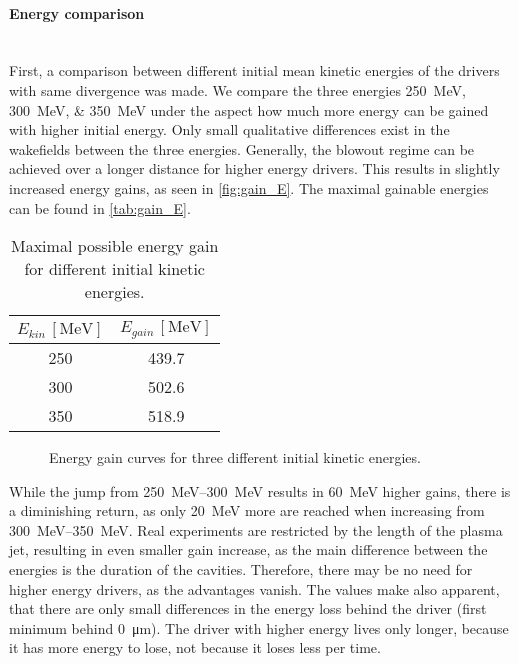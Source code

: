 \documentclass[bachelor_thesis]{subfiles}
\begin{document}
\paragraph*{Energy comparison}\hspace{0pt} \\
First, a comparison between different initial mean kinetic energies of the drivers with same divergence was made. We compare the three energies \qtylist{250; 300; 350}{\MeV} under the aspect how much more energy can be gained with higher initial energy.
Only small qualitative differences exist in the wakefields between the three energies. Generally, the blowout regime can be achieved over a longer distance for higher energy drivers.
This results in slightly increased energy gains, as seen in \autoref{fig:gain_E}. The maximal gainable energies can be found in \autoref{tab:gain_E}.
\begin{table}[h]
\begin{center}
\begin{tabular}{|c|c|} 
	\hline
 	$E_{kin} \, \mathrm{[MeV]}$ & $E_{gain} \, \mathrm{[MeV]}$ \\ 
 	\hline
	250 & 439.7 \\ 
 	300 & 502.6 \\
	350 & 518.9 \\
	\hline
\end{tabular}
\caption{Maximal possible energy gain for different initial kinetic energies.}\label{tab:gain_E}
\end{center}
\end{table}

\begin{figure}
	\centering
	\missingfigure{}
	\caption{Energy gain curves for three different initial kinetic energies.}
	\label{fig:gain_E}
\end{figure}

While the jump from \qtyrange{250}{300}{\MeV} results in \qty{60}{\MeV} higher gains, there is a diminishing return, as only \qty{20}{\MeV} more are reached when increasing from \qtyrange{300}{350}{\MeV}. Real experiments are restricted by the length of the plasma jet, 
resulting in even smaller gain increase, as the main difference between the energies is the duration of the cavities. Therefore, there may be no need for higher energy drivers, as the advantages vanish.
The values make also apparent, that there are only small differences in the energy loss behind the driver (first minimum behind \qty{0}{\um}). The driver with higher energy lives only longer, because it has more energy to lose, not because it loses less per time.
\end{document}
